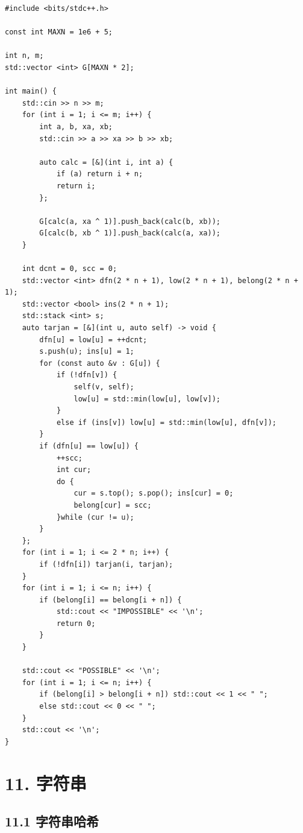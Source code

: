 \documentclass[UTF8,a4paper,11pt]{ctexart}
\begin{document}
\begin{Verbatim}[fontsize=\small,frame=single,breaklines=true,breakanywhere=true]
#include <bits/stdc++.h>

const int MAXN = 1e6 + 5;

int n, m;
std::vector <int> G[MAXN * 2];

int main() {
    std::cin >> n >> m;
    for (int i = 1; i <= m; i++) {
        int a, b, xa, xb;
        std::cin >> a >> xa >> b >> xb;

        auto calc = [&](int i, int a) {
            if (a) return i + n;
            return i;
        };

        G[calc(a, xa ^ 1)].push_back(calc(b, xb));
        G[calc(b, xb ^ 1)].push_back(calc(a, xa));
    }

    int dcnt = 0, scc = 0;
    std::vector <int> dfn(2 * n + 1), low(2 * n + 1), belong(2 * n + 1);
    std::vector <bool> ins(2 * n + 1);
    std::stack <int> s;
    auto tarjan = [&](int u, auto self) -> void {
        dfn[u] = low[u] = ++dcnt;
        s.push(u); ins[u] = 1;
        for (const auto &v : G[u]) {
            if (!dfn[v]) {
                self(v, self);
                low[u] = std::min(low[u], low[v]);
            }
            else if (ins[v]) low[u] = std::min(low[u], dfn[v]);
        }
        if (dfn[u] == low[u]) {
            ++scc;
            int cur;
            do {
                cur = s.top(); s.pop(); ins[cur] = 0;
                belong[cur] = scc;
            }while (cur != u);
        }
    };
    for (int i = 1; i <= 2 * n; i++) {
        if (!dfn[i]) tarjan(i, tarjan);
    }
    for (int i = 1; i <= n; i++) {
        if (belong[i] == belong[i + n]) {
            std::cout << "IMPOSSIBLE" << '\n';
            return 0;
        } 
    }

    std::cout << "POSSIBLE" << '\n';
    for (int i = 1; i <= n; i++) {
        if (belong[i] > belong[i + n]) std::cout << 1 << " ";
        else std::cout << 0 << " ";
    }
    std::cout << '\n';
}
\end{Verbatim}

\section*{11. 字符串}

\subsection*{11.1 字符串哈希}
\end{document}
